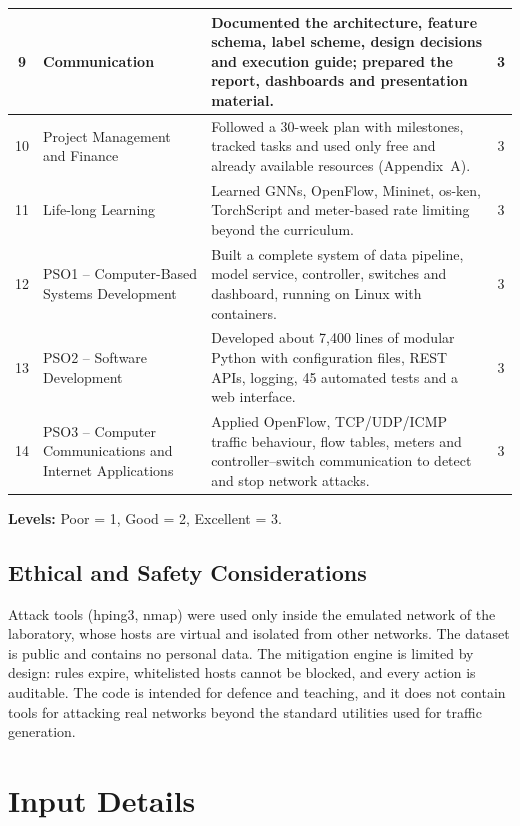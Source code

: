 \begin{appendices}
\begin{longtable}{|c|p{5.2cm}|p{7cm}|c|}
	9 &
	Communication &
	Documented the architecture, feature schema, label scheme, design decisions and execution guide; prepared the report, dashboards and presentation material. &
	3 \\ \hline

	10 &
	Project Management and Finance &
	Followed a 30-week plan with milestones, tracked tasks and used only free and already available resources (Appendix~A). &
	3 \\ \hline

	11 &
	Life-long Learning &
	Learned GNNs, OpenFlow, Mininet, os-ken, TorchScript and meter-based rate limiting beyond the curriculum. &
	3 \\ \hline

	12 &
	PSO1 -- Computer-Based Systems Development &
	Built a complete system of data pipeline, model service, controller, switches and dashboard, running on Linux with containers. &
	3 \\ \hline

	13 &
	PSO2 -- Software Development &
	Developed about 7,400 lines of modular Python with configuration files, REST APIs, logging, 45 automated tests and a web interface. &
	3 \\ \hline

	14 &
	PSO3 -- Computer Communications and Internet Applications &
	Applied OpenFlow, TCP/UDP/ICMP traffic behaviour, flow tables, meters and controller--switch communication to detect and stop network attacks. &
	3 \\ \hline

\end{longtable}

\noindent\textbf{Levels:} Poor = 1, Good = 2, Excellent = 3.


\section{Ethical and Safety Considerations}
Attack tools (hping3, nmap) were used only inside the emulated network of the laboratory, whose hosts are virtual and isolated from other networks. The dataset is public and contains no personal data. The mitigation engine is limited by design: rules expire, whitelisted hosts cannot be blocked, and every action is auditable. The code is intended for defence and teaching, and it does not contain tools for attacking real networks beyond the standard utilities used for traffic generation.

\chapter{Input Details}

\end{appendices}
